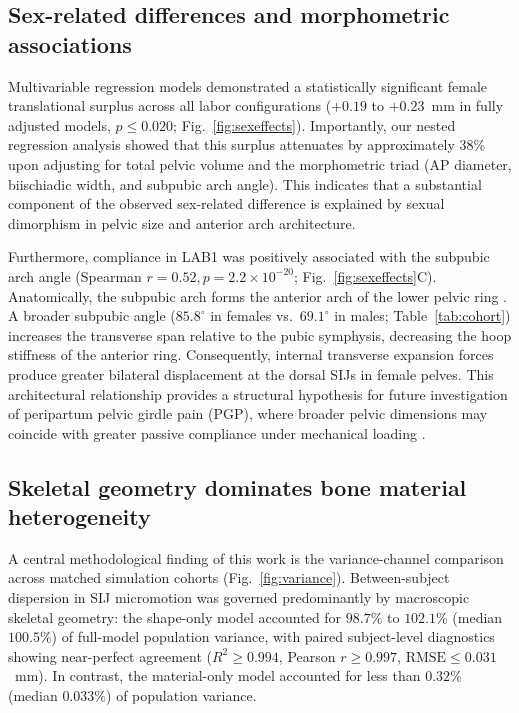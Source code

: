 \subsection*{Sex-related differences and morphometric associations}
Multivariable regression models demonstrated a statistically significant female translational surplus across all labor configurations ($+0.19$ to $+0.23$~mm in fully adjusted models, $p \le 0.020$; Fig.~\ref{fig:sexeffects}). Importantly, our nested regression analysis showed that this surplus attenuates by approximately 38\% upon adjusting for total pelvic volume and the morphometric triad (AP diameter, biischiadic width, and subpubic arch angle). This indicates that a substantial component of the observed sex-related difference is explained by sexual dimorphism in pelvic size and anterior arch architecture.

Furthermore, compliance in LAB1 was positively associated with the subpubic arch angle (Spearman $r = 0.52, p = 2.2 \times 10^{-20}$; Fig.~\ref{fig:sexeffects}C). Anatomically, the subpubic arch forms the anterior arch of the lower pelvic ring \citep{Ruff2017,Betti2020,Weiss2020}. A broader subpubic angle ($85.8^\circ$ in females vs.\ $69.1^\circ$ in males; Table~\ref{tab:cohort}) increases the transverse span relative to the pubic symphysis, decreasing the hoop stiffness of the anterior ring. Consequently, internal transverse expansion forces produce greater bilateral displacement at the dorsal SIJs in female pelves. This architectural relationship provides a structural hypothesis for future investigation of peripartum pelvic girdle pain (PGP), where broader pelvic dimensions may coincide with greater passive compliance under mechanical loading \citep{Hammer2019,Keizer2019}.

\subsection*{Skeletal geometry dominates bone material heterogeneity}
A central methodological finding of this work is the variance-channel comparison across matched simulation cohorts (Fig.~\ref{fig:variance}). Between-subject dispersion in SIJ micromotion was governed predominantly by macroscopic skeletal geometry: the shape-only model accounted for $98.7\%$ to $102.1\%$ (median $100.5\%$) of full-model population variance, with paired subject-level diagnostics showing near-perfect agreement ($R^2 \ge 0.994$, Pearson $r \ge 0.997$, $\text{RMSE} \le 0.031$~mm). In contrast, the material-only model accounted for less than $0.32\%$ (median $0.033\%$) of population variance.


